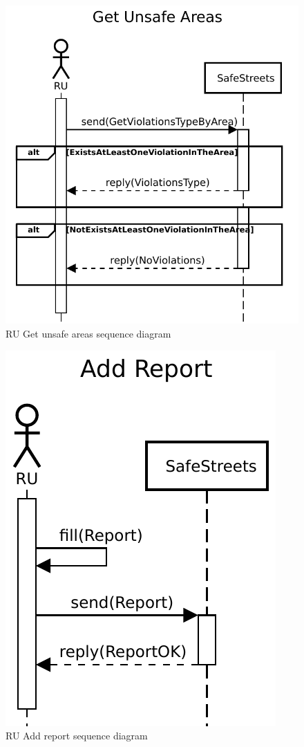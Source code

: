 					\begin{figure}[!h]
								\centering
							\includegraphics[height=0.4\textheight] {images/SequenceDiagram/User/GetViolationsTypeByArea.pdf}
								\caption{RU Get unsafe areas sequence diagram}
						\end{figure}
					\clearpage
					\begin{figure}[!h]
								\centering
							\includegraphics[height=0.5\textwidth] {images/SequenceDiagram/User/AddReport.pdf}
								\caption{RU Add report sequence diagram}
						\end{figure}
					\clearpage
